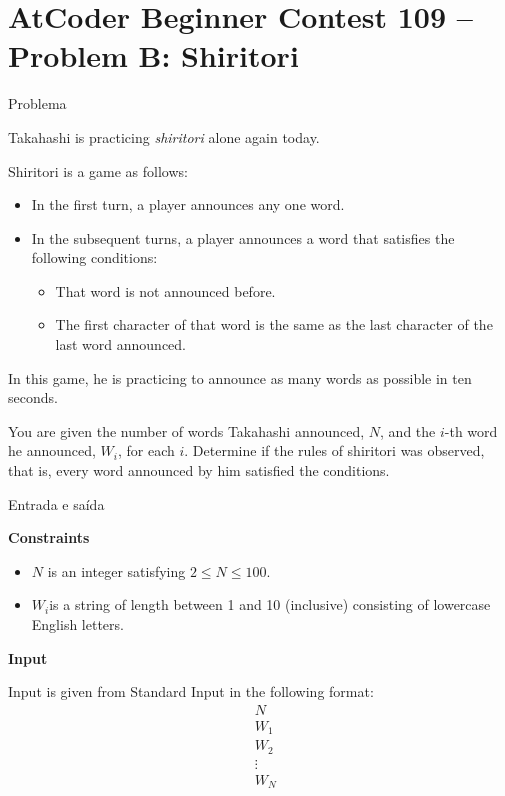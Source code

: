 \section{AtCoder Beginner Contest 109 -- Problem B: Shiritori}

\begin{frame}[fragile]{Problema}

Takahashi is practicing \textit{shiritori} alone again today.

Shiritori is a game as follows:

\begin{itemize}
    \item In the first turn, a player announces any one word.
    \item In the subsequent turns, a player announces a word that satisfies the following conditions:
        \begin{itemize}
            \item That word is not announced before.
            \item The first character of that word is the same as the last character of the last word announced.
        \end{itemize}
\end{itemize}

In this game, he is practicing to announce as many words as possible in ten seconds.

You are given the number of words Takahashi announced, $N$, and the $i$-th word he announced, 
$W_i$, for each $i$. Determine if the rules of shiritori was observed, that is, every word announced by him satisfied the conditions.

\end{frame}

\begin{frame}[fragile]{Entrada e saída}

\textbf{Constraints}

\begin{itemize}
    \item $N$ is an integer satisfying $2\leq N\leq 100$.
    \item $W_i$is a string of length between 1 and 10 (inclusive) consisting of lowercase English letters.
\end{itemize}

\textbf{Input}

Input is given from Standard Input in the following format:
\begin{align*}
&N\\
&W_1\\
&W_2\\
&\vdots \\
&W_N\\
\end{align*}
\end{frame}

